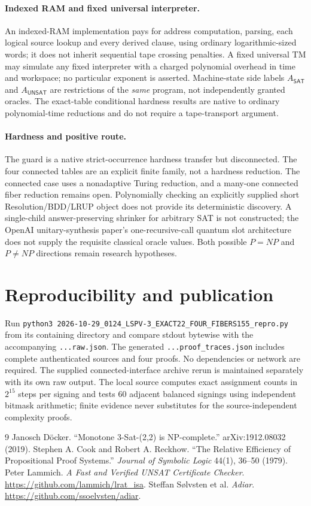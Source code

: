 \documentclass[11pt]{article}
\newcommand{\SAT}{\mathsf{SAT}}
\newcommand{\UNSAT}{\mathsf{UNSAT}}
\begin{document}
\paragraph{Indexed RAM and fixed universal interpreter.} An indexed-RAM implementation pays for address computation, parsing, each logical source lookup and every derived clause, using ordinary logarithmic-sized words; it does not inherit sequential tape crossing penalties. A fixed universal TM may simulate any fixed interpreter with a charged polynomial overhead in time and workspace; no particular exponent is asserted. Machine-state side labels $A_{\SAT}$ and $A_{\UNSAT}$ are restrictions of the \emph{same} program, not independently granted oracles. The exact-table conditional hardness results are native to ordinary polynomial-time reductions and do not require a tape-transport argument.

\paragraph{Hardness and positive route.} The guard is a native strict-occurrence hardness transfer but disconnected. The four connected tables are an explicit finite family, not a hardness reduction. The connected case uses a nonadaptive Turing reduction, and a many-one connected fiber reduction remains open. Polynomially checking an explicitly supplied short Resolution/BDD/LRUP object does not provide its deterministic discovery. A single-child answer-preserving shrinker for arbitrary SAT is not constructed; the OpenAI unitary-synthesis paper's one-recursive-call quantum slot architecture does not supply the requisite classical oracle values. Both possible $P=NP$ and $P\ne NP$ directions remain research hypotheses.

\section{Reproducibility and publication}
Run \texttt{python3 2026-10-29\_0124\_LSPV-3\_EXACT22\_FOUR\_FIBERS155\_repro.py} from its containing directory and compare stdout bytewise with the accompanying \texttt{...raw.json}. The generated \texttt{...proof\_traces.json} includes complete authenticated sources and four proofs. No dependencies or network are required. The supplied connected-interface archive rerun is maintained separately with its own raw output. The local source computes exact assignment counts in $2^{15}$ steps per signing and tests 60 adjacent balanced signings using independent bitmask arithmetic; finite evidence never substitutes for the source-independent complexity proofs.

\begin{thebibliography}{9}
 Janosch D\"ocker. ``Monotone 3-Sat-(2,2) is NP-complete.'' arXiv:1912.08032 (2019).
 Stephen A. Cook and Robert A. Reckhow. ``The Relative Efficiency of Propositional Proof Systems.'' \emph{Journal of Symbolic Logic} 44(1), 36--50 (1979).
 Peter Lammich. \emph{A Fast and Verified UNSAT Certificate Checker}. \url{https://github.com/lammich/lrat_isa}.
 Steffan S\o{}lvsten et al. \emph{Adiar}. \url{https://github.com/ssoelvsten/adiar}.
\end{thebibliography}
\end{document}
